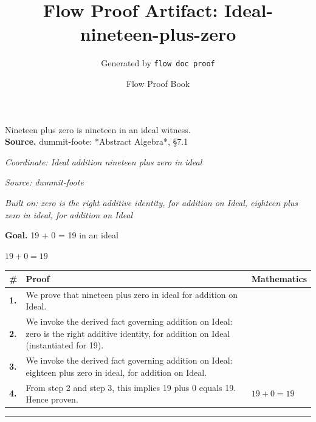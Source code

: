 \documentclass[11pt]{article}
\title{Flow Proof Artifact: Ideal-nineteen-plus-zero}
\author{Generated by \texttt{flow doc proof}}
\date{Flow Proof Book}
\theoremstyle{definition}
\begin{document}
\maketitle
Nineteen plus zero is nineteen in an ideal witness.\\[0.5em]
\textbf{Source.} dummit-foote: *Abstract Algebra*, §7.1\\[0.5em]
\bigskip
{}\par
\smallskip\noindent\textit{Coordinate: Ideal \cdot addition \cdot nineteen plus zero in ideal}\par
\smallskip\noindent\textit{Source: dummit-foote}\par
\smallskip\noindent\textit{Built on: zero is the right additive identity, for addition on Ideal, eighteen plus zero in ideal, for addition on Ideal}\par
\medskip
\noindent\textbf{Goal.} 19 + 0 = 19 in an ideal\par
\noindent$\displaystyle 19 + 0 = 19$\par
\medskip
\noindent
\begin{tabular}{@{} >{\raggedright\arraybackslash}p{} >{\raggedright\arraybackslash}p{} >{\raggedleft\arraybackslash}p{} @{}}
\textbf{\#} & \textbf{Proof} & \textbf{Mathematics} \\
\midrule
\textbf{1.} & We prove that nineteen plus zero in ideal for addition on Ideal. & \\[0.45em]
\textbf{2.} & We invoke the derived fact governing addition on Ideal: zero is the right additive identity, for addition on Ideal (instantiated for 19). & \\[0.45em]
\textbf{3.} & We invoke the derived fact governing addition on Ideal: eighteen plus zero in ideal, for addition on Ideal. & \\[0.45em]
\textbf{4.} & From step 2 and step 3, this implies 19 plus 0 equals 19. Hence proven. & $\displaystyle 19 + 0 = 19$ \\[0.45em]
\bottomrule
\end{tabular}
\label{thm:Ideal-addition-nineteen_plus_zero_in_ideal}
\par\medskip\hrule
\end{document}
